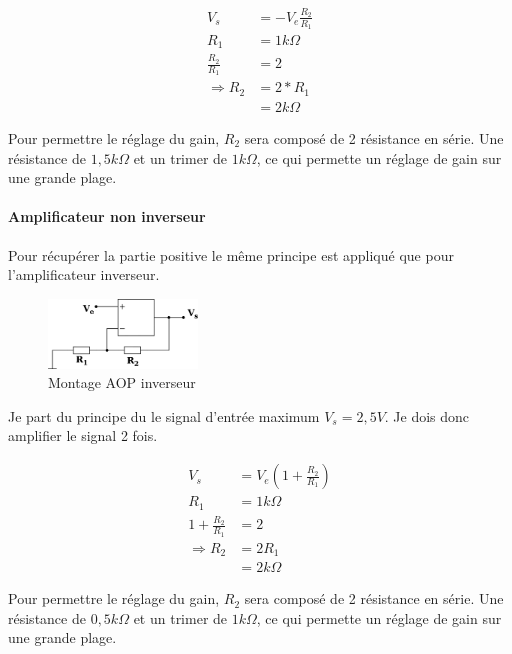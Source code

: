 \documentclass[11pt]{article}
\begin{document}
\begin{equation}
	 \begin{split}
		V_{s} &= - V_{e} \frac{R_{2}}{R_{1}}\\
		R_{1} &= 1k\Omega\\
		\frac{R_{2}}{R_{1}} &= 2\\
		\Rightarrow R_{2} &= 2 * R_{1}\\
		&= 2k\Omega
	\end{split}
\end{equation}

Pour permettre le réglage du gain, $R_{2}$ sera composé de 2 résistance en série. Une résistance de $1,5k\Omega$ et un trimer de $1k\Omega$, ce qui permette un réglage de gain sur une grande plage.

\paragraph{Amplificateur non inverseur}

Pour récupérer la partie positive le même principe est appliqué que pour l'amplificateur inverseur.

\begin{figure}[!h]
	\centering
	\includegraphics[width=150px]{AOP_amp.png}
	\caption{Montage AOP inverseur}
\end{figure}
\FloatBarrier

Je part du principe du le signal d'entrée maximum $V_{s} = 2,5V$. Je dois donc amplifier le signal 2 fois.

\begin{equation}
	 \begin{split}
		V_{s} &= V_{e} (1+\frac{R_{2}}{R_{1}})\\
		R_{1} &= 1k\Omega\\
		1+\frac{R_{2}}{R_{1}} &= 2\\
		\Rightarrow R_{2} &= 2 R_{1}\\
		&= 2k\Omega
	\end{split}
\end{equation}

Pour permettre le réglage du gain, $R_{2}$ sera composé de 2 résistance en série. Une résistance de $0,5k\Omega$ et un trimer de $1k\Omega$, ce qui permette un réglage de gain sur une grande plage.
\end{document}

